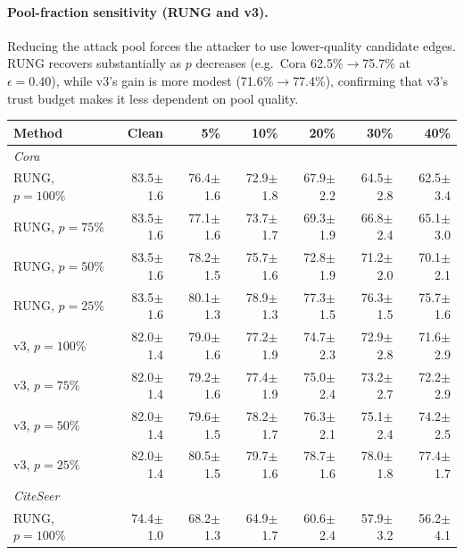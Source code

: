 \documentclass{article}
\newcommand{\score}[2]{#1{\scriptsize$\pm$#2}}
\begin{document}
\paragraph{Pool-fraction sensitivity (RUNG and v3).}
Reducing the attack pool forces the attacker to use lower-quality candidate
edges. RUNG recovers substantially as $p$ decreases (e.g.\ Cora
62.5\%$\to$75.7\% at $\epsilon{=}0.40$), while v3's gain is more modest
(71.6\%$\to$77.4\%), confirming that v3's trust budget makes it less dependent
on pool quality.

\begin{center}
\scriptsize
\begin{tabular}{lrrrrrr}
\toprule
Method & Clean & 5\% & 10\% & 20\% & 30\% & 40\% \\
\midrule
\multicolumn{7}{l}{\textit{Cora}} \\
\midrule
RUNG, $p{=}100\%$ & \score{83.5}{1.6} & \score{76.4}{1.6} & \score{72.9}{1.8} & \score{67.9}{2.2} & \score{64.5}{2.8} & \score{62.5}{3.4} \\
RUNG, $p{=}75\%$  & \score{83.5}{1.6} & \score{77.1}{1.6} & \score{73.7}{1.7} & \score{69.3}{1.9} & \score{66.8}{2.4} & \score{65.1}{3.0} \\
RUNG, $p{=}50\%$  & \score{83.5}{1.6} & \score{78.2}{1.5} & \score{75.7}{1.6} & \score{72.8}{1.9} & \score{71.2}{2.0} & \score{70.1}{2.1} \\
RUNG, $p{=}25\%$  & \score{83.5}{1.6} & \score{80.1}{1.3} & \score{78.9}{1.3} & \score{77.3}{1.5} & \score{76.3}{1.5} & \score{75.7}{1.6} \\
\addlinespace
v3, $p{=}100\%$   & \score{82.0}{1.4} & \score{79.0}{1.6} & \score{77.2}{1.9} & \score{74.7}{2.3} & \score{72.9}{2.8} & \score{71.6}{2.9} \\
v3, $p{=}75\%$    & \score{82.0}{1.4} & \score{79.2}{1.6} & \score{77.4}{1.9} & \score{75.0}{2.4} & \score{73.2}{2.7} & \score{72.2}{2.9} \\
v3, $p{=}50\%$    & \score{82.0}{1.4} & \score{79.6}{1.5} & \score{78.2}{1.7} & \score{76.3}{2.1} & \score{75.1}{2.4} & \score{74.2}{2.5} \\
v3, $p{=}25\%$    & \score{82.0}{1.4} & \score{80.5}{1.5} & \score{79.7}{1.6} & \score{78.7}{1.6} & \score{78.0}{1.8} & \score{77.4}{1.7} \\
\midrule
\multicolumn{7}{l}{\textit{CiteSeer}} \\
\midrule
RUNG, $p{=}100\%$ & \score{74.4}{1.0} & \score{68.2}{1.3} & \score{64.9}{1.7} & \score{60.6}{2.4} & \score{57.9}{3.2} & \score{56.2}{4.1} \\

\end{tabular}
\end{center}
\end{document}

